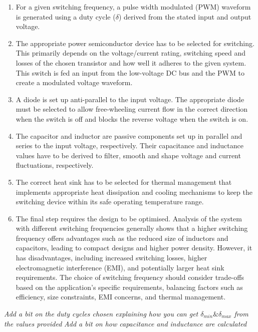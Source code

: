         \begin{enumerate}
            \item For a given switching frequency, a pulse width modulated (PWM) waveform is generated using a duty cycle (\(\delta\)) derived from the stated input and output voltage. 
            
            \item The appropriate power semiconductor device has to be selected for switching. This primarily depends on the voltage/current rating, switching speed and losses of the chosen transistor and how well it adheres to the given system. This switch is fed an input from the low-voltage DC bus and the PWM to create a modulated voltage waveform.

            \item A diode is set up anti-parallel to the input voltage. The appropriate diode must be selected to allow free-wheeling current flow in the correct direction when the switch is off and blocks the reverse voltage when the switch is on.

            \item The capacitor and inductor are passive components set up in parallel and series to the input voltage, respectively. Their capacitance and inductance values have to be derived to filter, smooth and shape voltage and current fluctuations, respectively.

            \item The correct heat sink has to be selected for thermal management that implements appropriate heat dissipation and cooling mechanisms to keep the switching device within its safe operating temperature range. 

            \item The final step requires the design to be optimised. Analysis of the system with different switching frequencies generally shows that a higher switching frequency offers advantages such as the reduced size of inductors and capacitors, leading to compact designs and higher power density. However, it has disadvantages, including increased switching losses, higher electromagnetic interference (EMI), and potentially larger heat sink requirements. The choice of switching frequency should consider trade-offs based on the application's specific requirements, balancing factors such as efficiency, size constraints, EMI concerns, and thermal management.
        \end{enumerate}

        \textit{Add a bit on the duty cycles chosen explaining how you can get \(\delta_{min} \& \delta_{max}\) from the values provided}
        \textit{Add a bit on how capacitance and inductance are calculated}

